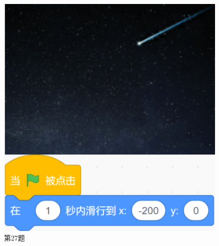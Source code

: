 \documentclass[10pt, a4paper]{article}
\begin{document}
\begin{figure}[htbp]
\begin{minipage}[t]{.2\textwidth}
            \includegraphics[width=\textwidth]{27.png}
            \caption*{第27题}
        \end{minipage}
        \begin{minipage}[t]{.16\textwidth}
            \centering

\end{minipage}
\end{figure}
\end{document}
